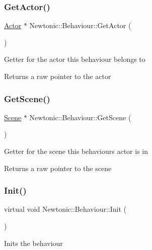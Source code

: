 \subsubsection{\texorpdfstring{GetActor()}{GetActor()}}
{\footnotesize\ttfamily \mbox{\hyperlink{classNewtonic_1_1Actor}{Actor}} $\ast$ Newtonic\+::\+Behaviour\+::\+Get\+Actor (\begin{DoxyParamCaption}{ }\end{DoxyParamCaption})}

Getter for the actor this behaviour belongs to \begin{DoxyReturn}{Returns}
a raw pointer to the actor 
\end{DoxyReturn}
\mbox{\label{classNewtonic_1_1Behaviour_aa042bb199f006f08571bd9465a9471b6}} 
\subsubsection{\texorpdfstring{GetScene()}{GetScene()}}
{\footnotesize\ttfamily \mbox{\hyperlink{classNewtonic_1_1Scene}{Scene}} $\ast$ Newtonic\+::\+Behaviour\+::\+Get\+Scene (\begin{DoxyParamCaption}{ }\end{DoxyParamCaption})}

Getter for the scene this behaviour\textquotesingle{}s actor is in \begin{DoxyReturn}{Returns}
a raw pointer to the scene 
\end{DoxyReturn}
\mbox{\label{classNewtonic_1_1Behaviour_a54a1d17213841de1d7bde8aaadfc99e4}} 
\subsubsection{\texorpdfstring{Init()}{Init()}}
{\footnotesize\ttfamily virtual void Newtonic\+::\+Behaviour\+::\+Init (\begin{DoxyParamCaption}{ }\end{DoxyParamCaption})\hspace{0.3cm}{\ttfamily [pure virtual]}}

Inits the behaviour 

